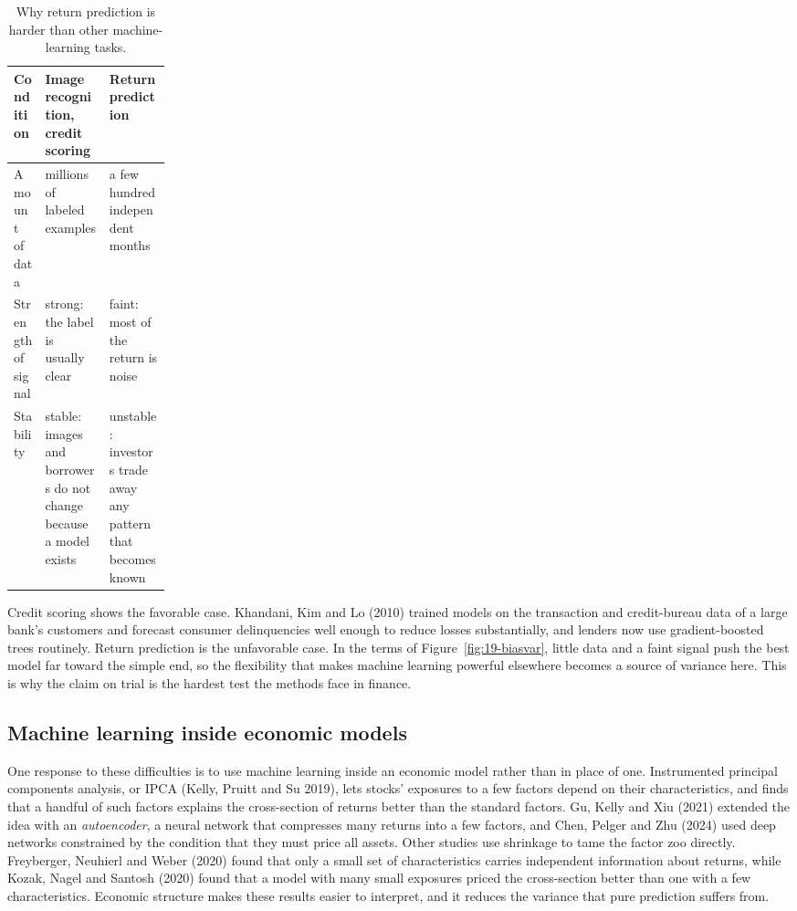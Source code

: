 \begin{table}[htbp]
\centering
\small
\caption{Why return prediction is harder than other machine-learning tasks.}
\label{tab:19-conditions}
\begin{tabularx}{0.9\linewidth}{@{}>{\raggedright\arraybackslash}p{0.2\linewidth}>{\raggedright\arraybackslash}X>{\raggedright\arraybackslash}X@{}}
\toprule
Condition & Image recognition, credit scoring & Return prediction \\
\midrule
Amount of data & millions of labeled examples & a few hundred independent months \\
Strength of signal & strong: the label is usually clear & faint: most of the return is noise \\
Stability & stable: images and borrowers do not change because a model exists & unstable: investors trade away any pattern that becomes known \\
\bottomrule
\end{tabularx}
\end{table}

Credit scoring shows the favorable case. Khandani, Kim and Lo (2010) trained models on the transaction and credit-bureau data of a large bank's customers and forecast consumer delinquencies well enough to reduce losses substantially, and lenders now use gradient-boosted trees routinely. Return prediction is the unfavorable case. In the terms of Figure~\ref{fig:19-biasvar}, little data and a faint signal push the best model far toward the simple end, so the flexibility that makes machine learning powerful elsewhere becomes a source of variance here. This is why the claim on trial is the hardest test the methods face in finance.

\subsection{Machine learning inside economic models}

One response to these difficulties is to use machine learning inside an economic model rather than in place of one. Instrumented principal components analysis, or IPCA (Kelly, Pruitt and Su 2019), lets stocks' exposures to a few factors depend on their characteristics, and finds that a handful of such factors explains the cross-section of returns better than the standard factors. Gu, Kelly and Xiu (2021) extended the idea with an \emph{autoencoder}, a neural network that compresses many returns into a few factors, and Chen, Pelger and Zhu (2024) used deep networks constrained by the condition that they must price all assets. Other studies use shrinkage to tame the factor zoo directly. Freyberger, Neuhierl and Weber (2020) found that only a small set of characteristics carries independent information about returns, while Kozak, Nagel and Santosh (2020) found that a model with many small exposures priced the cross-section better than one with a few characteristics. Economic structure makes these results easier to interpret, and it reduces the variance that pure prediction suffers from.



